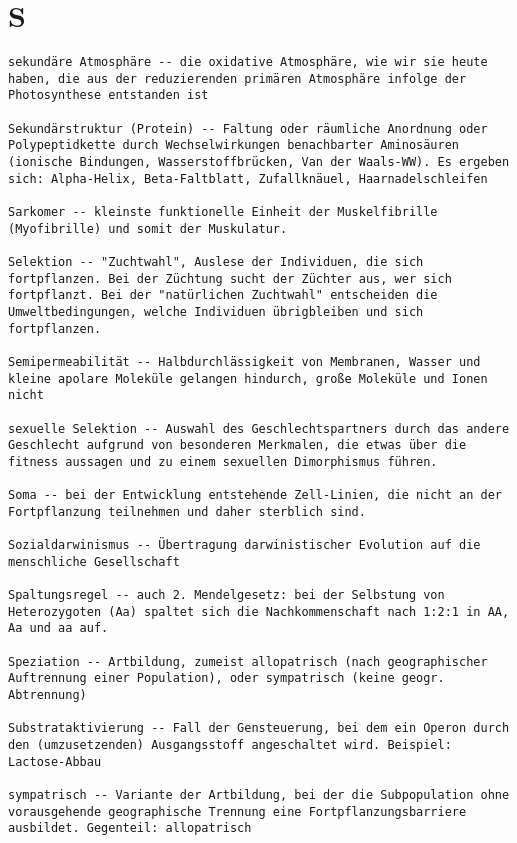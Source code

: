 \documentclass{article}
\begin{document}
\section{S}
\begin{verbatim}
sekundäre Atmosphäre -- die oxidative Atmosphäre, wie wir sie heute haben, die aus der reduzierenden primären Atmosphäre infolge der Photosynthese entstanden ist

Sekundärstruktur (Protein) -- Faltung oder räumliche Anordnung oder Polypeptidkette durch Wechselwirkungen benachbarter Aminosäuren (ionische Bindungen, Wasserstoffbrücken, Van der Waals-WW). Es ergeben sich: Alpha-Helix, Beta-Faltblatt, Zufallknäuel, Haarnadelschleifen

Sarkomer -- kleinste funktionelle Einheit der Muskelfibrille (Myofibrille) und somit der Muskulatur.

Selektion -- "Zuchtwahl", Auslese der Individuen, die sich fortpflanzen. Bei der Züchtung sucht der Züchter aus, wer sich fortpflanzt. Bei der "natürlichen Zuchtwahl" entscheiden die Umweltbedingungen, welche Individuen übrigbleiben und sich fortpflanzen.

Semipermeabilität -- Halbdurchlässigkeit von Membranen, Wasser und kleine apolare Moleküle gelangen hindurch, große Moleküle und Ionen nicht

sexuelle Selektion -- Auswahl des Geschlechtspartners durch das andere Geschlecht aufgrund von besonderen Merkmalen, die etwas über die fitness aussagen und zu einem sexuellen Dimorphismus führen.

Soma -- bei der Entwicklung entstehende Zell-Linien, die nicht an der Fortpflanzung teilnehmen und daher sterblich sind.

Sozialdarwinismus -- Übertragung darwinistischer Evolution auf die menschliche Gesellschaft

Spaltungsregel -- auch 2. Mendelgesetz: bei der Selbstung von Heterozygoten (Aa) spaltet sich die Nachkommenschaft nach 1:2:1 in AA, Aa und aa auf.

Speziation -- Artbildung, zumeist allopatrisch (nach geographischer Auftrennung einer Population), oder sympatrisch (keine geogr. Abtrennung)

Substrataktivierung -- Fall der Gensteuerung, bei dem ein Operon durch den (umzusetzenden) Ausgangsstoff angeschaltet wird. Beispiel: Lactose-Abbau

sympatrisch -- Variante der Artbildung, bei der die Subpopulation ohne vorausgehende geographische Trennung eine Fortpflanzungsbarriere ausbildet. Gegenteil: allopatrisch


\end{verbatim}
\end{document}
